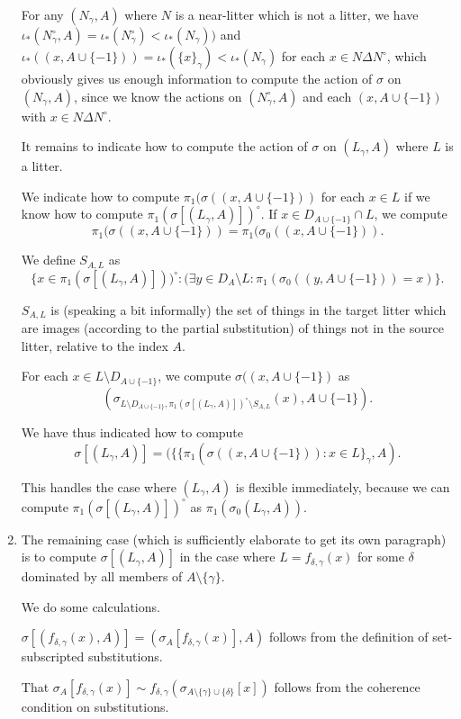 \documentclass[12pt]{article}
\begin{document}
\begin{enumerate}
For any $(N_\gamma,A)$ where $N$ is a near-litter which is not a litter, we have $\iota_*(N^\circ_\gamma,A) = \iota_*(N^\circ_\gamma)<\iota_*(N_\gamma))$ and $\iota_*((x,A\cup \{-1\})) = \iota_*(\{x\}_\gamma)<\iota_*(N_\gamma)$ for each $x \in N \Delta N^\circ$, which obviously gives us enough information to compute the action of $\sigma$ on $(N_\gamma,A)$,
since we know the actions on $(N^\circ_\gamma,A)$ and each $(x,A\cup \{-1\})$ with $x \in N \Delta N^\circ$.

It remains to indicate how to compute the action of $\sigma$ on $(L_\gamma,A)$ where $L$ is a litter.

We indicate how to compute $\pi_1(\sigma((x,A \cup \{-1\}))$ for each $x \in L$ if we know how to compute $\pi_1(\sigma[(L_\gamma,A)])^\circ$.  If $x \in D_{A\cup \{-1\}} \cap L$, we compute  $$\pi_1(\sigma((x,A \cup \{-1\}))= \pi_1(\sigma_0((x,A \cup \{-1\})).$$  


We define $S_{A,L}$ as $$\{x \in \pi_1(\sigma[(L_\gamma,A)]))^\circ: (\exists y \in D_A \setminus L: \pi_1(\sigma_0((y,A \cup \{-1\})) =x)\}.$$

$S_{A,L}$ is (speaking a bit informally) the set of things in the target litter which are images (according to the partial substitution) of things not in the source litter, relative to the index $A$.


For each $x \in L \setminus D_{A \cup \{-1\}}$, we compute $\sigma((x,A \cup \{-1\})$ as $$(\sigma_{L \setminus D_{A \cup \{-1\}},\pi_1(\sigma[(L_\gamma,A)])^\circ \setminus S_{A,L}}(x),A \cup \{-1\}).$$

We have thus indicated how to compute $$\sigma[(L_\gamma,A)] = (\{\{\pi_1(\sigma((x,A \cup \{-1\})):x \in L\}_\gamma,A).$$

This handles the case where $(L_\gamma,A)$ is flexible immediately, because we can compute $\pi_1(\sigma[(L_\gamma,A)])^\circ$ as $\pi_1(\sigma_0(L_\gamma,A))$.

\item The remaining case (which is sufficiently elaborate to get its own paragraph)  is to compute $\sigma[(L_\gamma,A)]$ in the case where $L = f_{\delta,\gamma}(x)$ for some $\delta$ dominated by all members of $A \setminus \{\gamma\}$.

We do some calculations.  

$\sigma[( f_{\delta,\gamma}(x),A)] = (\sigma_{A}[ f_{\delta,\gamma}(x)],A)$ follows from the definition of set-subscripted substitutions.

That $\sigma_{A}[ f_{\delta,\gamma}(x)] \sim f_{\delta,\gamma}(\sigma_{A\setminus \{\gamma\}\cup \{\delta\}}[x])$ follows from the coherence condition on substitutions.


\end{enumerate}
\end{document}
